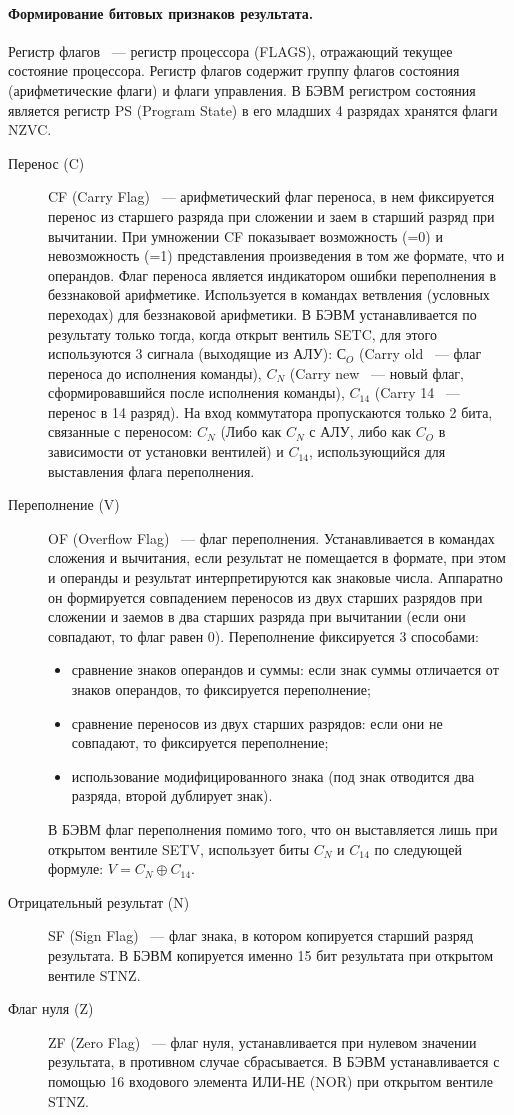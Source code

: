\documentclass[11pt]{article}
\begin{document}
	\paragraph{Формирование битовых признаков результата.}
	Регистр флагов ~--- регистр процессора (FLAGS), отражающий текущее состояние процессора. Регистр флагов содержит группу флагов состояния (арифметические флаги) и флаги управления. В БЭВМ регистром состояния является регистр PS (Program State) в его младших 4 разрядах хранятся флаги NZVC.
	\begin{description}
		\item[Перенос (C)] CF (Carry Flag) ~--- арифметический флаг переноса, в нем фиксируется перенос из старшего разряда при сложении и заем в старший разряд при вычитании. При умножении CF показывает возможность (=0) и невозможность (=1) представления произведения в том же формате, что и операндов. Флаг переноса является индикатором ошибки переполнения в беззнаковой арифметике. Используется в командах ветвления (условных переходах) для беззнаковой арифметики. В БЭВМ устанавливается по результату только тогда, когда открыт вентиль SETC, для этого используются 3 сигнала (выходящие из АЛУ): $С_O$ (Carry old ~--- флаг переноса до исполнения команды), $C_N$ (Carry new ~--- новый флаг, сформировавшийся после исполнения команды), $C_{14}$ (Carry 14 ~--- перенос в 14 разряд). На вход коммутатора пропускаются только 2 бита, связанные с переносом: $C_N$ (Либо как $C_N$ с АЛУ, либо как $C_O$ в зависимости от установки вентилей) и $C_{14}$, использующийся для выставления флага переполнения.
		\item[Переполнение (V)] OF (Overflow Flag) ~--- флаг переполнения. Устанавливается в командах сложения и вычитания, если результат не помещается в формате, при этом и операнды и результат интерпретируются как знаковые числа. Аппаратно он формируется совпадением переносов из двух старших разрядов при сложении и заемов в два старших разряда при вычитании (если они совпадают, то флаг равен 0). Переполнение фиксируется 3 способами:
		\begin{itemize}
			\item сравнение знаков операндов и суммы: если знак суммы отличается от знаков операндов, то фиксируется переполнение;
			\item сравнение переносов из двух старших разрядов: если они не совпадают, то фиксируется переполнение;
			\item использование модифицированного знака (под знак отводится два разряда, второй дублирует знак).
		\end{itemize}
		В БЭВМ флаг переполнения помимо того, что он выставляется лишь при открытом вентиле SETV, использует биты $C_N$ и $C_{14}$ по следующей формуле: $V = C_N \oplus C_{14}$.
		\item[Отрицательный результат (N)] SF (Sign Flag) ~--- флаг знака, в котором копируется старший разряд результата. В БЭВМ копируется именно 15 бит результата при открытом вентиле STNZ.
		\item[Флаг нуля (Z)] ZF (Zero Flag) ~--- флаг нуля, устанавливается при нулевом значении результата, в противном случае сбрасывается. В БЭВМ устанавливается с помощью 16 входового элемента ИЛИ-НЕ (NOR) при открытом вентиле STNZ.
	\end{description}
\end{document}

